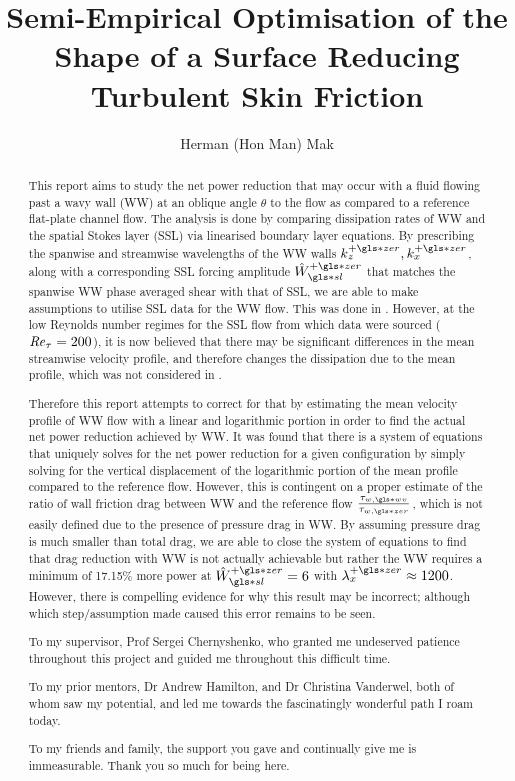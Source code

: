 \documentclass[a4paper, twoside]{report}
\title{Semi-Empirical Optimisation of the Shape of a Surface Reducing Turbulent Skin Friction}
\author{Herman (Hon Man) Mak}
\newcommand{\ssl}{\ensuremath{_{\gls*{sl}}}}
\newcommand{\pz}{\ensuremath{^{+\gls*{zer}}}}
\newcommand\Rey{\mbox{\textit{Re}}}  %
\begin{document}


\begin{titlepage}
\begin{abstract}
	This report aims to study the net power reduction that may occur with a fluid flowing past a wavy wall (WW) at an oblique angle $\theta$ to the flow as compared to a reference flat-plate channel flow. The analysis is done by comparing dissipation rates of WW and the spatial Stokes layer (SSL) via linearised boundary layer equations. By prescribing the spanwise and streamwise wavelengths of the WW walls $k_z\pz,k_x\pz$, along with a corresponding SSL forcing amplitude $\hat{W}\ssl\pz$ that matches the spanwise WW phase averaged shear with that of SSL, we are able to make assumptions to utilise SSL data for the WW flow. This was done in \textcite{chernyshenko2013}. However, at the low Reynolds number regimes for the SSL flow from which data were sourced ($\Rey_\tau=200$), it is now believed that there may be significant differences in the mean streamwise velocity profile, and therefore changes the dissipation due to the mean profile, which was not considered in  \textcite{chernyshenko2013}.

	Therefore this report attempts to correct for that by estimating the mean velocity profile of WW flow with a linear and logarithmic portion in order to find the actual net power reduction achieved by WW. It was found that there is a system of equations that uniquely solves for the net power reduction for a given configuration by simply solving for the vertical displacement of the logarithmic portion of the mean profile compared to the reference flow. However, this is contingent on a proper estimate of the ratio of wall friction drag between WW and the reference flow $\frac{\tau_{w,\gls*{wv}}}{\tau_{w,\gls*{zer}}}$, which is not easily defined due to the presence of pressure drag in WW. By assuming pressure drag is much smaller than total drag, we are able to close the system of equations to find that drag reduction with WW is not actually achievable but rather the WW requires a minimum of 17.15\% more power at $\hat{W}\ssl\pz=6$ with  $\lambda_x\pz\approx1200$. However, there is compelling evidence for why this result may be incorrect; although which step/assumption made caused this error remains to be seen.
\end{abstract}

\renewcommand{\abstractname}{Acknowledgements}
\begin{abstract}
	To my supervisor, Prof Sergei Chernyshenko, who granted me undeserved patience throughout this project and guided me throughout this difficult time.

	To my prior mentors, Dr Andrew Hamilton, and Dr Christina Vanderwel, both of whom saw my potential, and led me towards the fascinatingly wonderful path I roam today.

	To my friends and family, the support you gave and continually give me is immeasurable. Thank you so much for being here.
\end{abstract}
\end{titlepage}
\end{document}
